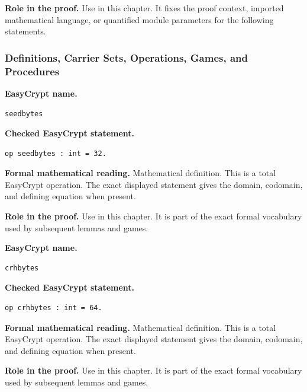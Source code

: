 \noindent\textbf{Role in the proof.}
Use in this chapter. It fixes the proof context, imported mathematical language, or quantified module parameters for the following statements.

\subsubsection*{Definitions, Carrier Sets, Operations, Games, and Procedures}
\begin{formaldefinition}
\noindent\textbf{EasyCrypt name.}
\begin{lstlisting}[language=EasyCrypt,basicstyle=\ttfamily\scriptsize]
seedbytes
\end{lstlisting}
\noindent\textbf{Checked EasyCrypt statement.}
\begin{lstlisting}[language=EasyCrypt,basicstyle=\ttfamily\scriptsize]
op seedbytes : int = 32.
\end{lstlisting}
\noindent\textbf{Formal mathematical reading.}
Mathematical definition. This is a total EasyCrypt operation.  The exact displayed statement gives the domain, codomain, and defining equation when present.

\noindent\textbf{Role in the proof.}
Use in this chapter. It is part of the exact formal vocabulary used by subsequent lemmas and games.

\end{formaldefinition}

\begin{formaldefinition}
\noindent\textbf{EasyCrypt name.}
\begin{lstlisting}[language=EasyCrypt,basicstyle=\ttfamily\scriptsize]
crhbytes
\end{lstlisting}
\noindent\textbf{Checked EasyCrypt statement.}
\begin{lstlisting}[language=EasyCrypt,basicstyle=\ttfamily\scriptsize]
op crhbytes : int = 64.
\end{lstlisting}
\noindent\textbf{Formal mathematical reading.}
Mathematical definition. This is a total EasyCrypt operation.  The exact displayed statement gives the domain, codomain, and defining equation when present.

\noindent\textbf{Role in the proof.}
Use in this chapter. It is part of the exact formal vocabulary used by subsequent lemmas and games.

\end{formaldefinition}

